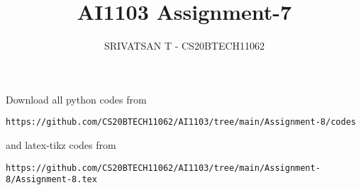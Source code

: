 \documentclass[journal,12pt,twocolumn]{IEEEtran}
\DeclareMathOperator*{\Res}{Res}
\begin{document}
\newcommand{\BEQA}{\begin{eqnarray}}
        \newcommand{\EEQA}{\end{eqnarray}}
\newcommand{\define}{\stackrel{\triangle}{=}}

\raggedbottom
\setlength{\parindent}{0pt}
\providecommand{\mbf}{\mathbf}
\providecommand{\pr}[1]{\ensuremath{\Pr\left(#1\right)}}
\providecommand{\qfunc}[1]{\ensuremath{Q\left(#1\right)}}
\providecommand{\sbrak}[1]{\ensuremath{{}\left[#1\right]}}
\providecommand{\lsbrak}[1]{\ensuremath{{}\left[#1\right.}}
\providecommand{\rsbrak}[1]{\ensuremath{{}\left.#1\right]}}
\providecommand{\brak}[1]{\ensuremath{\left(#1\right)}}
\providecommand{\lbrak}[1]{\ensuremath{\left(#1\right.}}
\providecommand{\rbrak}[1]{\ensuremath{\left.#1\right)}}
\providecommand{\cbrak}[1]{\ensuremath{\left\{#1\right\}}}
\providecommand{\lcbrak}[1]{\ensuremath{\left\{#1\right.}}
\providecommand{\rcbrak}[1]{\ensuremath{\left.#1\right\}}}
\theoremstyle{remark}
\newtheorem{rem}{Remark}
\newcommand{\sgn}{\mathop{\mathrm{sgn}}}
\providecommand{\abs}[1]{\vert#1\vert}
\providecommand{\res}[1]{\Res\displaylimits_{#1}}
\providecommand{\norm}[1]{\lVert#1\rVert}
\providecommand{\mtx}[1]{\mathbf{#1}}
\providecommand{\mean}[1]{E[#1]}
\providecommand{\fourier}{\overset{\mathcal{F}}{ \rightleftharpoons}}
\providecommand{\system}{\overset{\mathcal{H}}{ \longleftrightarrow}}
\newcommand{\solution}{\noindent \textbf{Solution: }}
\newcommand{\cosec}{\,\text{cosec}\,}
\newcommand{\comb}[2]{{}^{#1}\mathrm{C}_{#2}}
\providecommand{\dec}[2]{\ensuremath{\overset{#1}{\underset{#2}{\gtrless}}}}
\newcommand{\myvec}[1]{\ensuremath{\begin{pmatrix}#1\end{pmatrix}}}
\newcommand{\mydet}[1]{\ensuremath{\begin{vmatrix}#1\end{vmatrix}}}
\makeatletter
{}
\makeatother
\let\StandardTheFigure\thefigure
\let\vec\mathbf
\renewcommand{\thefigure}{\theproblem}
\def\putbox#1#2#3{\makebox[0in][l]{\makebox[#1][l]{}\raisebox{\baselineskip}[0in][0in]{\raisebox{#2}[0in][0in]{#3}}}}
\def\rightbox#1{\makebox[0in][r]{#1}}
\def\centbox#1{\makebox[0in]{#1}}
\def\topbox#1{\raisebox{-\baselineskip}[0in][0in]{#1}}
\def\midbox#1{\raisebox{-0.5\baselineskip}[0in][0in]{#1}}
\vspace{3cm}
\title{AI1103 Assignment-7}
\author{SRIVATSAN T - CS20BTECH11062}
\maketitle
\newpage
\bigskip
\renewcommand{\thefigure}{\theenumi}
\renewcommand{\thetable}{\theenumi}
Download all python codes from
\begin{lstlisting}
https://github.com/CS20BTECH11062/AI1103/tree/main/Assignment-8/codes
\end{lstlisting}
%
and latex-tikz codes from
%
\begin{lstlisting}
https://github.com/CS20BTECH11062/AI1103/tree/main/Assignment-8/Assignment-8.tex
\end{lstlisting}
\end{document}
